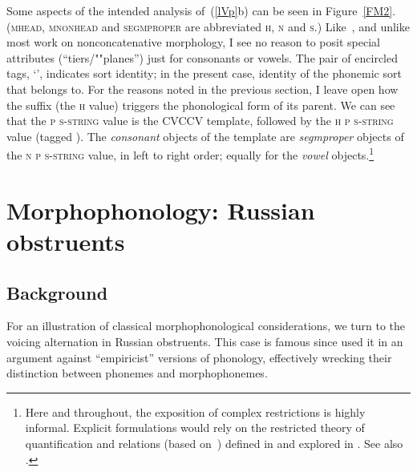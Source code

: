 \documentclass[output=paper]{langsci/langscibook}
\begin{document}
Some aspects of the intended analysis of~(\ref{lVp}b) can be seen
in Figure~\ref{FM2}.  
(\textsc{mhead}, \textsc{mnonhead} and \textsc{segmproper} are abbreviated
\textsc{h}, \textsc{n} and \textsc{s}.)
Like~\cite[224\hspace{1pt}\nolinebreak f.\@]{scob:97}, and 
unlike
most work on nonconcatenative morphology, I see no reason to
posit special attributes (``tiers/""planes'') just for consonants or vowels.
The pair of encircled tags, `', indicates sort identity; in the
present case, identity of the phonemic sort that \textipa{[o]} belongs to.
For the reasons noted in the previous section, I leave open how the suffix
(the \textsc{h} value) triggers the phonological form of its parent. We can
see that the \textsc{p s-string} value is the {\small CVCCV} template,
followed by the \textsc{h p s-string} value (tagged ).  The \textit{consonant}\/ objects of the template are \textit{segmproper}\/ objects of
the \textsc{n p s-string} value, in left to right order; equally for the \textit{vowel}\/ objects.\footnote{\label{RSRL}%
	Here and throughout, the
  exposition of complex restrictions is highly informal.  Explicit
  formulations would rely on the restricted theory of quantification and
  relations (based on~\citealt{king:89}) defined
  in \cite[22--35]{rich:97} and explored
  in \cite{ric:kin:97}.  See also \cite{rich:98a}.%
}






\section{Morphophonology: Russian obstruents}
\label{sectRuss}



\subsection{Background}
\label{sec:1.7.1}


For an illustration of classical morphophonological considerations, we turn
to the voicing alternation in Russian obstruents. This case
is famous since \cite[21--24]{hall:59} used it in an
argument against ``empiricist'' versions of phonology, effectively wrecking
their distinction between phonemes and morphophonemes.
\end{document}
